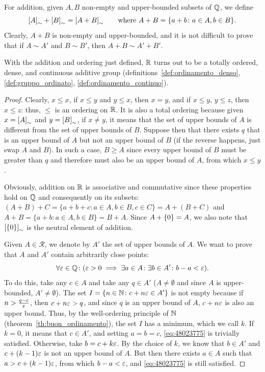 For addition, given $A,B$ non-empty and upper-bounded subsets of ${\mathbb Q}$, we
define
\[
  {\left[ A \right]}_\sim+{\left[ B \right]}_\sim
  = {\left[ A+B \right]}_\sim
  \qquad\text{where $A+B = {\left\{ a+b\colon a \in A, b \in B \right\}}$.}
\]
Clearly, $A+B$ is non-empty and upper-bounded, and it is not difficult to prove
that if $A\sim A'$ and $B\sim B'$, then $A+B\sim A'+B'$.

\begin{theorem}
  \label{th:reali_gruppo_continuo}%
With the addition and ordering just defined, ${\mathbb R}$ turns out to be a totally
ordered, dense, and continuous additive group
(definitions~\ref{def:ordinamento_denso}, \ref{def:gruppo_ordinato},
\ref{def:ordinamento_continuo}).
\end{theorem}
\begin{proof}
    Clearly, $x\le x$, if $x\le y$ and $y\le x$, then $x=y$, and if $x\le y$,
  $y\le z$, then $x\le z$: thus, $\le$ is an ordering on ${\mathbb R}$. It is also a
  total ordering because given $x={\left[ A \right]}_\sim$ and $y={\left[ B \right]}_\sim$, if
  $x\neq y$, it means that the set of upper bounds of $A$ is different from the
  set of upper bounds of $B$. Suppose then that there exists $q$ that is an
  upper bound of $A$ but not an upper bound of $B$ (if the reverse happens, just
  swap $A$ and $B$). In such a case, $B\ge A$ since every upper bound of $B$
  must be greater than $q$ and therefore must also be an upper bound of $A$,
  from which $x\le y$.
  
    Obviously, addition on ${\mathbb R}$ is associative and commutative since these
  properties hold on ${\mathbb Q}$ and consequently on its subsets: $(A+B)+C = \{
  a+b+c\colon a\in A, b\in B, c\in C\} = A + (B+C)$ and $A+B = \{a+b\colon a\in
  A, b\in B\} = B+A$. Since $A+{\left\{ 0 \right\}} = A$, we also note that
  ${\left[ {\left\{ 0 \right\}} \right]}_\sim$ is the neutral element of addition.
  
    Given $A\in \mathcal R$, we denote by $A'$ the set of upper bounds of $A$.
  We want to prove that $A$ and $A'$ contain arbitrarily close points:
  \begin{equation}\label{eq:48023775}
  \forall \varepsilon\in{\mathbb Q}\colon (\varepsilon >0 \implies \exists a \in A\colon \exists b\in A'\colon
  b-a < \varepsilon).
  \end{equation}
    To do this, take any $c\in A$ and take any $q\in A'$ ($A\neq \emptyset$ and
  since $A$ is upper-bounded, $A'\neq \emptyset$). The set $I={\left\{ n\in {\mathbb N}
  \colon c+n\varepsilon\in A' \right\}}$ is not empty because if $n>\frac{q-c}{\varepsilon}$, then
  $c+n\varepsilon>q$, and since $q$ is an upper bound of $A$, $c+n\varepsilon$ is also an
  upper bound. Thus, by the well-ordering principle of ${\mathbb N}$
  (theorem~\ref{th:buon_ordinamento}), the set $I$ has a minimum, which we call
  $k$. If $k=0$, it means that $c\in A'$, and setting $a=b=c$,
  \eqref{eq:48023775} is trivially satisfied. Otherwise, take $b=c+k\varepsilon$. By
  the choice of $k$, we know that $b\in A'$ and $c+(k-1)\varepsilon$ is not an upper
  bound of $A$. But then there exists $a\in A$ such that $a>c+(k-1)\varepsilon$, from
  which $b-a < \varepsilon$, and \eqref{eq:48023775} is still satisfied.
  

\end{proof}
